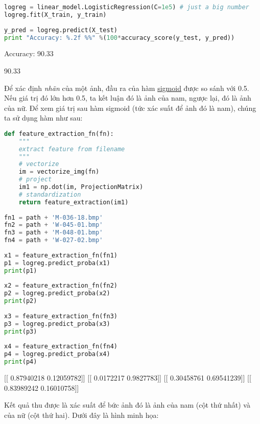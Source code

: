  
\begin{lstlisting}[language=Python]
logreg = linear_model.LogisticRegression(C=1e5) # just a big number  
logreg.fit(X_train, y_train) 
 
y_pred = logreg.predict(X_test) 
print "Accuracy: %.2f %%" %(100*accuracy_score(y_test, y_pred)) 
\end{lstlisting}
 
    Accuracy: 90.33 %
 
90.33%
 
Để xác định \textit{nhãn} của một ảnh, đầu ra của hàm \href{http://machinelearningcoban.com/2017/01/27/logisticregression/#sigmoid-function}{sigmoid} được so sánh với 0.5. Nếu giá trị đó lớn hơn 0.5, ta kết luận đó là ảnh của nam, ngược lại, đó là ảnh của nữ. Để xem giá trị sau hàm sigmoid (tức xác suất để ảnh đó là nam), chúng ta sử dụng hàm  như sau: 
 
\begin{lstlisting}[language=Python]
def feature_extraction_fn(fn): 
    """ 
    extract feature from filename 
    """ 
    # vectorize 
    im = vectorize_img(fn) 
    # project 
    im1 = np.dot(im, ProjectionMatrix) 
    # standardization  
    return feature_extraction(im1) 
 
fn1 = path + 'M-036-18.bmp' 
fn2 = path + 'W-045-01.bmp' 
fn3 = path + 'M-048-01.bmp' 
fn4 = path + 'W-027-02.bmp' 
 
x1 = feature_extraction_fn(fn1) 
p1 = logreg.predict_proba(x1) 
print(p1) 
 
x2 = feature_extraction_fn(fn2) 
p2 = logreg.predict_proba(x2) 
print(p2) 
 
x3 = feature_extraction_fn(fn3) 
p3 = logreg.predict_proba(x3) 
print(p3) 
 
x4 = feature_extraction_fn(fn4) 
p4 = logreg.predict_proba(x4) 
print(p4) 
\end{lstlisting}
 
    [[ 0.87940218  0.12059782]] 
    [[ 0.0172217  0.9827783]] 
    [[ 0.30458761  0.69541239]] 
    [[ 0.83989242  0.16010758]] 
 
Kết quả thu được là xác suất để bức ảnh đó là ảnh của nam (cột thứ nhất) và của nữ (cột thứ hai). Dưới đây là hình minh họa: 
 
 
